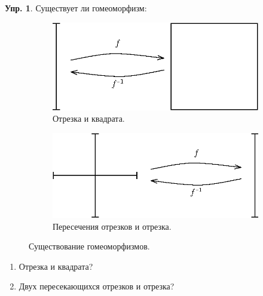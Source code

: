 \documentclass[12pt]{article}
\theoremstyle{definition}
\newtheorem{exrc}{Упр.}
\begin{document}
\begin{exrc}
	Существует ли гомеоморфизм:
	\begin{figure}[H]
		\centering
		\begin{subfigure}[c]{0.5\textwidth}
			\centering
			\includegraphics{11_4.eps}
			\caption{Отрезка и квадрата.}
			\label{fig:11_4}
		\end{subfigure}
		\begin{subfigure}[c]{0.49\textwidth}
			\centering
			\includegraphics{11_5.eps}
			\caption{Пересечения отрезков и отрезка.}
			\label{fig:11_5}
		\end{subfigure}
		\caption{Существование гомеоморфизмов.}	
		\label{fig:Гомеоморфизм}
	\end{figure}
	\begin{enumerate}[label ={\arabic*)}]
		\item Отрезка и квадрата?
		\item Двух пересекающихся отрезков и отрезка?
	\end{enumerate}
\end{exrc}
\end{document}
